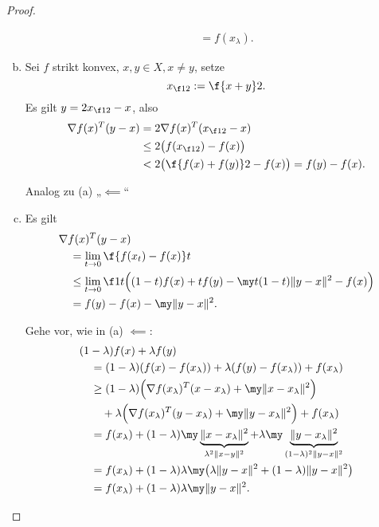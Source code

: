 \begin{st}
\begin{proof}
\begin{enumerate}[(a)]
\begin{segnb}[„$\impliedby$“]
\begin{align*}
						&\quad= f(x_\lambda).
					\end{align*}
				\end{segnb}
			\item
				\begin{segnb}[„$\implies$“]
					Sei $f$ strikt konvex, $x, y \in X, x\neq y$, setze
					\[
						x_{\f 12} := \f {x + y}2.
					\]
					Es gilt $y = 2 x_{\f 12} - x$, also
					\begin{align*}
						\nabla f(x)^T (y-x)
						&= 2 \nabla f(x)^T (x_{\f 12} - x) \\
						&\le 2 \big(f(x_{\f 12}) - f(x)\big) \\
						&< 2 \big(\f {f(x) + f(y)}2 - f(x)\big)
						= f(y) - f(x).
					\end{align*}
				\end{segnb}
				\begin{segnb}[„$\impliedby$“]
					Analog zu (a) „$\impliedby$“
				\end{segnb}
			\item
				\begin{segnb}[„$\implies$“]
					Es gilt
					\begin{align*}
						&\nabla f(x)^T (y-x) \\
						&\quad= \lim_{t\to 0} \f {f(x_t) - f(x)}t \\
						&\quad\le \lim_{t\to 0} \f 1t \Big( (1-t)f(x) + tf(y) - \my t(1-t)\|y-x\|^2 - f(x) \Big) \\
						&\quad= f(y) - f(x) - \my \|y-x\|^2.
					\end{align*}
				\end{segnb}
				\begin{segnb}[„$\impliedby$“]
					Gehe vor, wie in (a) $\impliedby$:
					\begin{align*}
						&(1-\lambda) f(x) + \lambda f(y) \\
						&\quad= (1-\lambda) (f(x) - f(x_\lambda)) + \lambda (f(y) - f(x_\lambda)) + f(x_\lambda) \\
						&\quad\ge (1-\lambda) \Big(\nabla f(x_\lambda)^T (x-x_\lambda) + \my \|x-x_\lambda\|^2 \Big) \\
						    &\quad\quad + \lambda \Big( \nabla f(x_\lambda)^T (y-x_\lambda) + \my \|y-x_\lambda\|^2 \Big) + f(x_\lambda) \\
						&\quad= f(x_\lambda) + (1-\lambda)\my \underbrace{\|x - x_\lambda\|^2}_{\lambda^2 \|x-y\|^2} + \lambda \my \underbrace{\|y-x_\lambda\|^2}_{(1-\lambda)^2\|y-x\|^2} \\
						&\quad=  f(x_\lambda) + (1-\lambda)\lambda \my \big( \lambda \|y-x\|^2 + (1-\lambda) \|y-x\|^2 \big) \\
						&\quad=  f(x_\lambda) + (1-\lambda)\lambda \my \|y-x\|^2.
					\end{align*}
				\end{segnb}
		\end{enumerate}
	\end{proof}
\end{st}

